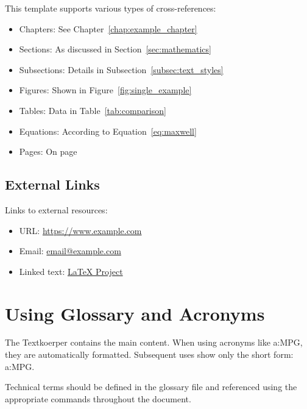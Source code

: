 This template supports various types of cross-references:

\begin{itemize}
	\item Chapters: See Chapter~\ref{chap:example_chapter}
	\item Sections: As discussed in Section~\ref{sec:mathematics}
	\item Subsections: Details in Subsection~\ref{subsec:text_styles}
	\item Figures: Shown in Figure~\ref{fig:single_example}
	\item Tables: Data in Table~\ref{tab:comparison}
	\item Equations: According to Equation~\eqref{eq:maxwell}
	\item Pages: On page~\pageref{sec:lists}
\end{itemize}

\subsection*{External Links}
\label{subsec:external_links}

Links to external resources:
\begin{itemize}
	\item URL: \url{https://www.example.com}
	\item Email: \href{mailto:email@example.com}{email@example.com}
	\item Linked text: \href{https://www.latex-project.org}{LaTeX Project}
\end{itemize}

\section{Using Glossary and Acronyms}
\label{sec:glossary_usage}

The \gls{Textkoerper} contains the main content. When using acronyms like
\acrfull{a:MPG}, they are automatically formatted. Subsequent uses show only
the short form: \acrshort{a:MPG}.

Technical terms should be defined in the glossary file and referenced using
the appropriate commands throughout the document.

